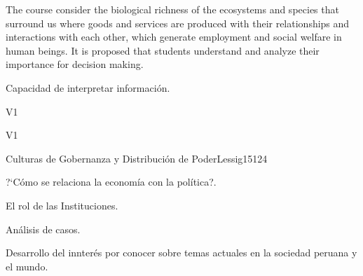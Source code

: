 \begin{syllabus}


\begin{justification}
The course consider the biological richness of the ecosystems and species that surround us where goods and services are produced with their relationships and interactions with each other, which generate employment and social welfare in human beings. It is proposed that students understand and analyze their importance for decision making.
\end{justification}

\begin{goals}
\item Capacidad de interpretar información.
\end{goals}

\begin{outcomes}{V1}
    \item {}
    \item {}
    \item {}
    
\end{outcomes}

\begin{competences}{V1}
    \item {}
    \item {}
    \item {}
    \item {}
\end{competences}

\begin{unit}{Culturas de Gobernanza y Distribución de Poder}{}{Lessig15}{12}{4}
   \begin{topics}
      \item ?`Cómo se relaciona la economía con la política?.
      \item El rol de las Instituciones.
      \item Análisis de casos.
   \end{topics}
   \begin{learningoutcomes}
      \item Desarrollo del innterés por conocer sobre temas actuales en la sociedad peruana y el mundo.
   \end{learningoutcomes}
\end{unit}

\begin{coursebibliography}
\end{coursebibliography}

\end{syllabus}
